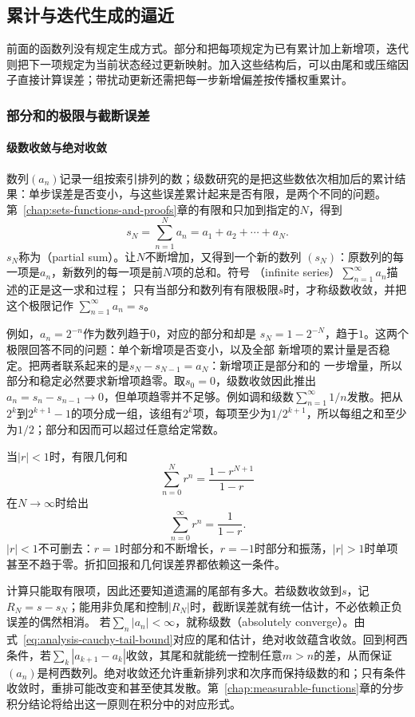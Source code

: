 \subsection{累计与迭代生成的逼近}

前面的函数列没有规定生成方式。部分和把每项规定为已有累计加上新增项，迭代则把下一项规定为当前状态经过更新映射。加入这些结构后，可以由尾和或压缩因子直接计算误差；带扰动更新还需把每一步新增偏差按传播权重累计。

\subsubsection{部分和的极限与截断误差}

\paragraph{级数收敛与绝对收敛}

数列$(a_n)$记录一组按索引排列的数；级数研究的是把这些数依次相加后的累计结果：单步误差是否变小，与这些误差累计起来是否有限，是两个不同的问题。第~\ref{chap:sets-functions-and-proofs}章的有限和只加到指定的$N$，得到
\[
  s_N=\sum_{n=1}^{N}a_n=a_1+a_2+\cdots+a_N.
\]
$s_N$称为（partial sum）。让$N$不断增加，又得到一个新的数列
$(s_N)$：原数列的每一项是$a_n$，新数列的每一项是前$N$项的总和。符号
（infinite series）$\sum_{n=1}^{\infty}a_n$描述的正是这一求和过程；
只有当部分和数列有有限极限$s$时，才称级数收敛，并把这个极限记作
$\sum_{n=1}^{\infty}a_n=s$。

例如，$a_n=2^{-n}$作为数列趋于$0$，对应的部分和却是
$s_N=1-2^{-N}$，趋于$1$。这两个极限回答不同的问题：单个新增项是否变小，以及全部
新增项的累计量是否稳定。把两者联系起来的是$s_N-s_{N-1}=a_N$：新增项正是部分和的
一步增量，所以部分和稳定必然要求新增项趋零。取$s_0=0$，级数收敛因此推出
$a_n=s_n-s_{n-1}\to0$，但单项趋零并不足够。例如调和级数$\sum_{n=1}^{\infty}1/n$发散。把从$2^k$到$2^{k+1}-1$的项分成一组，该组有$2^k$项，每项至少为$1/2^{k+1}$，所以每组之和至少为$1/2$；部分和因而可以超过任意给定常数。

当$|r|<1$时，有限几何和
\[   \sum_{n=0}^{N}r^n=\frac{1-r^{N+1}}{1-r} \]
在$N\to\infty$时给出
\begin{equation}
  \sum_{n=0}^{\infty}r^n=\frac{1}{1-r}.
\label{eq:analysis-geometric-series}
\end{equation}
$|r|<1$不可删去：$r=1$时部分和不断增长，$r=-1$时部分和振荡，$|r|>1$时单项甚至不趋于零。折扣回报和几何误差界都依赖这一条件。

计算只能取有限项，因此还要知道遗漏的尾部有多大。若级数收敛到$s$，记
$R_N=s-s_N$；能用非负尾和控制$|R_N|$时，截断误差就有统一估计，不必依赖正负误差的偶然相消。
若$\sum_n|a_n|<\infty$，就称级数（absolutely converge）。由式~\eqref{eq:analysis-cauchy-tail-bound}对应的尾和估计，绝对收敛蕴含收敛。回到柯西条件，若$\sum_k|a_{k+1}-a_k|$收敛，其尾和就能统一控制任意$m>n$的差，从而保证$(a_n)$是柯西数列。绝对收敛还允许重新排列求和次序而保持级数的和；只有条件收敛时，重排可能改变和甚至使其发散。第~\ref{chap:measurable-functions}章的分步积分结论将给出这一原则在积分中的对应形式。

